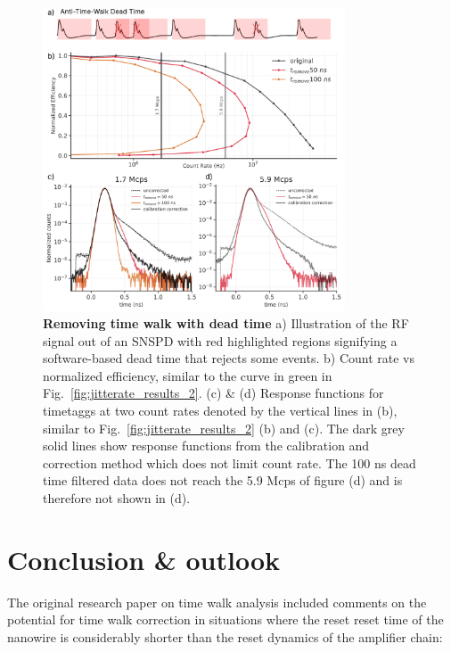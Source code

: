 \documentclass[11pt]{caltech_thesis} %
\begin{document}
\hypertarget{fig:dead_time}{%
\begin{figure}
\centering
\includegraphics[width=0.8\textwidth,height=\textheight]{./chapter_03/figs/cut_count_rate_v2_light.pdf}
\caption[{Removing time walk with dead time}]{\textbf{Removing time walk with dead time} a) Illustration of the RF signal out of an SNSPD with red highlighted regions signifying a software-based dead time that rejects some events. b) Count rate vs normalized efficiency, similar to the curve in green in Fig.~\ref{fig:jitterate_results_2}. (c) \& (d) Response functions for timetaggs at two count rates denoted by the vertical lines in (b), similar to Fig.~\ref{fig:jitterate_results_2} (b) and (c). The dark grey solid lines show response functions from the calibration and correction method which does not limit count rate. The 100 ns dead time filtered data does not reach the 5.9 Mcps of figure (d) and is therefore not shown in (d).}
\label{fig:dead_time}
\end{figure}
}

\hypertarget{conclusion-outlook}{%
\section{Conclusion \& outlook}\label{conclusion-outlook}}

The original research paper on time walk analysis \autocite{Mueller2023} included comments on the potential for time walk correction in situations where the reset reset time of the nanowire is considerably shorter than the reset dynamics of the amplifier chain:
\end{document}
